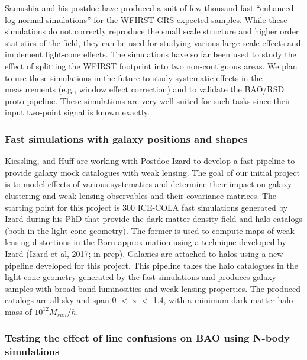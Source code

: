  Samushia and his postdoc have produced a suit of few thousand fast
 ``enhanced log-normal simulations'' for the WFIRST GRS expected samples. While
 these simulations do  not correctly reproduce the small scale structure and
 higher order statistics of the field, they can be used for studying various
 large scale effects and implement light-cone effects. The simulations have so
 far been used to study the effect of splitting the WFIRST footprint into two
 non-contiguous areas. We plan to use these simulations in the future to study
 systematic effects in the measurements (e.g., window effect correction) and to
 validate the BAO/RSD proto-pipeline. These simulations are very well-suited for
 such tasks since their input two-point signal is known exactly.

 \subsubsection{Fast simulations with galaxy positions and shapes}

 Kiessling, and Huff are working with Postdoc Izard to develop a fast
 pipeline to provide galaxy mock catalogues with weak lensing. The goal of our
 initial project is to model effects of various systematics and determine their
 impact on galaxy clustering and weak lensing observables and their covariance
 matrices. The starting point for this project is  300 ICE-COLA fast simulations
 \citep{Tassev:2013pn,Izard:2015dja} generated by Izard during his PhD that
 provide the dark matter density field and halo catalogs (both in the light cone
 geometry). The former is used to compute maps of weak lensing distortions in
 the Born approximation using a technique developed by Izard (Izard et al, 2017;
 in prep). Galaxies are attached to halos using a new pipeline developed for
 this project. This pipeline takes the halo catalogues in the light cone
 geometry generated by the fast simulations and produces galaxy samples with
 broad band luminosities and weak lensing properties. The produced catalogs are
 all sky and span 0 $<$ z $<$ 1.4, with a minimum dark matter halo mass of
 $10^{12}  M_{sun}/h$.

 \subsubsection{Testing the effect of line confusions on BAO using N-body simulations}

